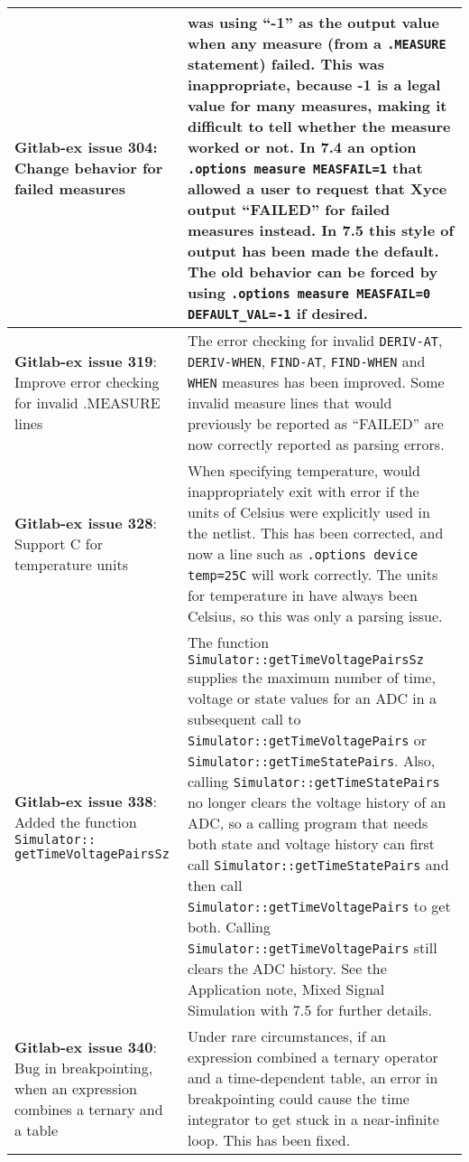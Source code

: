 {\begin{longtable}[h] {>{\raggedright\small}m{2in}|>{\raggedright\let\\\tabularnewline\small}m{3.5in}}
\textbf{Gitlab-ex issue 304}: Change \Xyce{} behavior for failed measures &
\Xyce{} was using ``-1'' as the output value when any measure (from a
\texttt{.MEASURE} statement) failed.  This was inappropriate, because -1 is a
legal value for many measures, making it difficult to tell whether the
measure worked or not.  In \Xyce{} 7.4 an option \texttt{.options
measure MEASFAIL=1} that allowed a user to request that Xyce output
``FAILED'' for failed measures instead.  In \Xyce{} 7.5 this style of
output has been made the default.  The old behavior can be forced by
using \texttt{.options measure MEASFAIL=0 DEFAULT\_VAL=-1} if
desired. \\ \hline

\textbf{Gitlab-ex issue 319}:  Improve error checking for invalid
.MEASURE lines & The error checking for invalid \texttt{DERIV-AT},
\texttt{DERIV-WHEN}, \texttt{FIND-AT}, \texttt{FIND-WHEN} and
\texttt{WHEN} measures has been improved.  Some invalid measure
lines that would previously be reported as ``FAILED'' are now
correctly reported as parsing errors. \\ \hline

\textbf{Gitlab-ex issue 328}:  Support C for temperature units &
  When specifying temperature, \Xyce{} would inappropriately exit with
  error if the units of Celsius were explicitly used in the netlist.
  This has been corrected, and now a line such as \texttt{.options
  device temp=25C} will work correctly.  The units for temperature
  in \Xyce{} have always been Celsius, so this was only a parsing
  issue. \\ \hline

\textbf{Gitlab-ex issue 338}: Added the function \texttt{Simulator:: getTimeVoltagePairsSz} &
The function \texttt{Simulator::getTimeVoltagePairsSz} supplies the
maximum number of time, voltage or state values for an ADC in a
subsequent call to \texttt{Simulator::getTimeVoltagePairs}
or \texttt{Simulator::getTimeStatePairs}.  Also,
calling \texttt{Simulator::getTimeStatePairs} no longer clears the
voltage history of an ADC, so a calling program that needs both state
and voltage history can first
call \texttt{Simulator::getTimeStatePairs} and then call
\texttt{Simulator::getTimeVoltagePairs} to get both.  Calling
\texttt{Simulator::getTimeVoltagePairs} still clears the ADC history.
See the Application note, Mixed Signal Simulation with \Xyce{} 7.5 for further
details. \\ \hline

\textbf{Gitlab-ex issue 340}: Bug in breakpointing, when an expression combines a ternary and a table &
  Under rare circumstances, if an expression combined a ternary
  operator and a time-dependent table, an error in breakpointing could
  cause the time integrator to get stuck in a near-infinite loop.
  This has been fixed.  \\ \hline


\end{longtable}}
